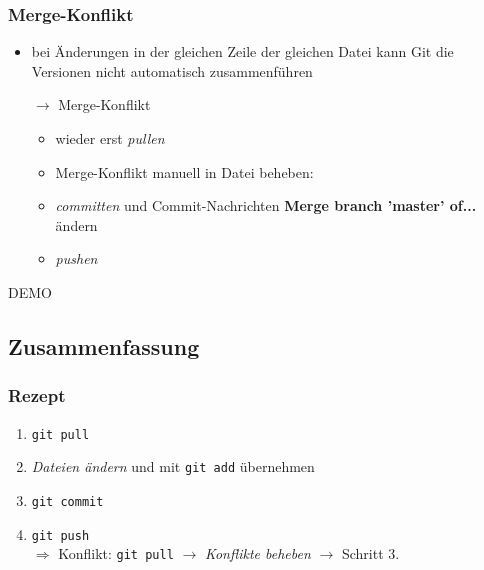 \documentclass[accentcolor=tud8b,colorbacktitle,inverttitle,landscape,german,presentation,t]{tudbeamer}
\begin{document}
			\begin{frame}
				\frametitle{Merge-Konflikt}
					\begin{itemize}
						\item bei Änderungen in der gleichen Zeile der gleichen Datei kann Git die Versionen nicht automatisch zusammenführen
						\item[$\rightarrow$] Merge-Konflikt
						\begin{itemize}
							\item wieder erst \textit{pullen}
							\item Merge-Konflikt manuell in Datei beheben:\\
							
							\item \textit{committen} und Commit-Nachrichten \textbf{Merge branch 'master' of...} ändern
							\item \textit{pushen}
						\end{itemize}
					\end{itemize}
				
			\end{frame}
			
			\begin{frame}
				DEMO
			\end{frame}
		
	\subsection{Zusammenfassung}
		\begin{frame}
		\frametitle{Rezept}
			\begin{enumerate}
				\item \texttt{git pull}
				\item \textit{Dateien ändern} und mit \texttt{git add} übernehmen
				\item \texttt{git commit}
				\item \texttt{git push}\\
				$\Rightarrow$ Konflikt: \texttt{git pull} $\rightarrow$ \textit{Konflikte beheben} $\rightarrow$ Schritt 3.
				
			\end{enumerate}
		\end{frame}
	
\end{document}
